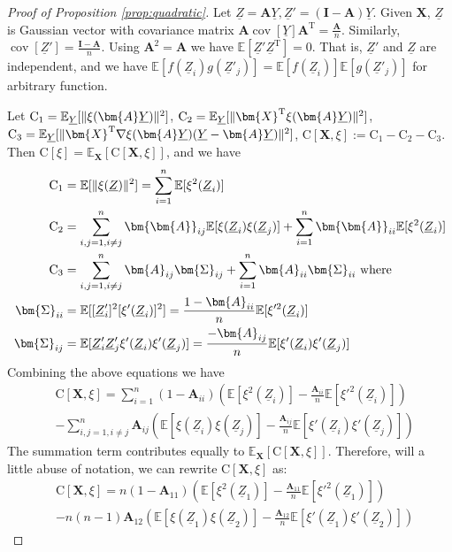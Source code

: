 \documentclass[conference]{IEEEtran}
\DeclarePairedDelimiter\norm{\lVert}{\rVert}
\def\E{\mathbb{E}}
\def\T{\mathrm{T}}
\DeclareMathOperator*{\Cov}{cov}
\begin{document}
\begin{proof}[Proof of Proposition \ref{prop:quadratic}]
Let $\underline{Z} = \bm{A}\underline{Y}, \underline{Z}' = (\mathbf{I} - \bm{A})\underline{Y}$. Given $\bm{X}$, $\underline{Z}$ is Gaussian vector with covariance matrix $\bm{A} \Cov[\underline{Y}] \bm{A}^\T = \frac{\bm{A}}{n}$. Similarly, $\Cov[\underline{Z}'] = \frac{\mathbf{I} - \bm{A}}{n}$. Using $\bm{A}^2 = \bm{A}$ we have $\E[\underline{Z}'\underline{Z}^\T] = 0$. That is, $\underline{Z}'$ and $\underline{Z}$ are independent, and we have $\E[f(\underline{Z}_i)g(\underline{Z}'_j)] = \E[f(\underline{Z}_i)]\E[g(\underline{Z}'_j)]$ for arbitrary function.
    
Let $\mathrm{C}_1 = \E_{\underline{Y}} [\norm{\xi(\bm{A}\underline{Y})}^2]$, $\mathrm{C}_2 
= \E_{\underline{Y}}
[\norm{\bm{X}^\T\xi(\bm{A}\underline{Y})}^2]$, $\mathrm{C}_3 
= \E_{\underline{Y}}
[\norm{\bm{X}^\T \nabla\xi(\bm{A}\underline{Y})(\underline{Y}-\bm{A}\underline{Y})}^2]$,
$\mathrm{C}[\bm{X}, \xi] :=  \mathrm{C}_1 - \mathrm{C}_2 - \mathrm{C}_3$. Then $\mathrm{C}[\xi] = \E_{\bm{X}}[\mathrm{C}[\bm{X}, \xi]]$,
and we have
\begin{align*}
    \mathrm{C}_1 &=\E[\norm{\xi(\underline{Z})}^2] = \sum_{i=1}^n \E[\xi^2(\underline{Z}_i)] \\
    \mathrm{C}_2 &= \sum_{i,j=1, i \neq j}^n \bm{\bm{A}}_{ij}\E[\xi(\underline{Z}_i)\xi(\underline{Z}_j)] +
    \sum_{i=1}^n \bm{\bm{A}}_{ii}  \E[\xi^2(\underline{Z}_i)]\\
    \mathrm{C}_3 & = \sum_{i,j=1, i \neq j}^n \bm{A}_{ij}\bm{\Sigma}_{ij} +
    \sum_{i=1}^n \bm{A}_{ii}\bm{\Sigma}_{ii}     \textrm{ where }\\
    \bm{\Sigma}_{ii} &=  \E[ [\underline{Z}'_i]^2 [\xi'(\underline{Z}_i)]^2] = \frac{1-\bm{A}_{ii}}{n}\E[\xi'^2(\underline{Z}_i)]   \\
    \bm{\Sigma}_{ij} &=  \E[\underline{Z}'_i \underline{Z}'_j \xi'(\underline{Z}_i)
    \xi'(\underline{Z}_j)]
     =  \frac{-\bm{A}_{ij}}{n} \E[ \xi'(\underline{Z}_i)
    \xi'(\underline{Z}_j)]
\end{align*}
Combining the above equations we have
\begin{align*}
   &  \mathrm{C}[\bm{X}, \xi] = \sum_{i=1}^n (1-\bm{A}_{ii})(\E[\xi^2(\underline{Z}_i)] -
    \frac{ \bm{A}_{ii}}{n} \E[ \xi'^2(\underline{Z}_i)]) \\
    &- \sum_{i,j=1, i \neq j}^n \bm{A}_{ij} (\E[\xi(\underline{Z}_i)\xi(\underline{Z}_j)] -
    \frac{\bm{A}_{ij}}{n}\E[\xi'(\underline{Z}_i) \xi'(\underline{Z}_j)])
\end{align*}
The summation term contributes equally to $\E_{\bm{X}}[\mathrm{C}[\bm{X}, \xi]]$. Therefore, will a little abuse of notation,
we can rewrite $\mathrm{C}[\bm{X}, \xi]$ as:
\begin{align*}
    &  \mathrm{C}[\bm{X}, \xi] =n(1-\bm{A}_{11})(\E[\xi^2(\underline{Z}_1)] -
    \frac{\bm{A}_{11}}{n}  \E[ \xi'^2(\underline{Z}_1)]) \\
    &- n(n-1)\bm{A}_{12}(\E[\xi(\underline{Z}_1)\xi(\underline{Z}_2)] -
    \frac{\bm{A}_{12}}{n}\E[\xi'(\underline{Z}_1)
   \xi'(\underline{Z}_2)])\nonumber
\end{align*}


\end{proof}
\end{document}
